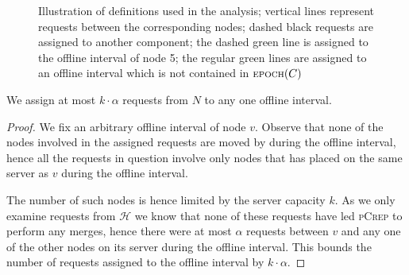 \documentclass[a4paper,UKenglish,cleveref, autoref, thm-restate,authorcolumns]{lipics-v2019}
\newcommand{\adjDel}{\textsc{pCrep}}
\newcommand{\opt}{\text{O{\scriptsize PT}}}
\newcommand{\epoch}{\text{\scriptsize EPOCH}}
\begin{document}
\begin{center}
\begin{figure}
		\centering
		\caption{Illustration of definitions used in the analysis; vertical lines 
		represent requests between the corresponding nodes; dashed black requests 
		are assigned to another component; the dashed green line is assigned to 
		the offline interval of node 5; the regular green lines are assigned to 
		an offline interval which is not contained in $\epoch(C)$}\label{analysis_def_illustration}
	\end{figure}
\end{center}

\begin{lemma}
	\label{offl_int_lemma}
	We assign at most $k\cdot\alpha$ requests from $N$ to any one offline interval.
\end{lemma}

\begin{proof}
	We fix an arbitrary offline interval of node $v$. Observe that none of the nodes involved in the assigned requests are moved by \opt{} during the offline interval, hence all the requests in question involve only nodes that \opt{} has placed on the same server as $v$ during the offline interval. 
	
	The number of such nodes is hence limited by the server capacity $k$. As we only examine requests from $\mathcal{H}$ we know that none of these requests have led \adjDel{} to perform any merges, hence there were at most $\alpha$ requests between $v$ and any one of the other nodes on its server during the offline interval. This bounds the number of requests assigned to the offline interval by $k\cdot\alpha$.
\end{proof}
\end{document}
